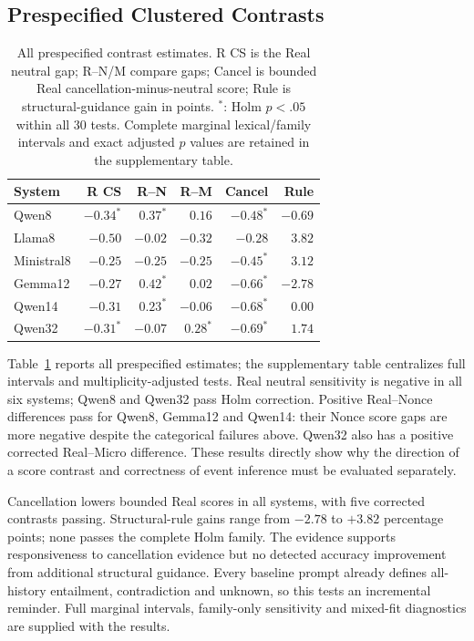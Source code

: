 \documentclass[sigconf,anonymous,review]{acmart}
\begin{document}
\subsection{Prespecified Clustered Contrasts}
\begin{table}[t]
\centering
\caption{All prespecified contrast estimates. R CS is the Real neutral gap; R--N/M compare gaps; Cancel is bounded Real cancellation-minus-neutral score; Rule is structural-guidance gain in points. $^{*}$: Holm $p<.05$ within all 30 tests. Complete marginal lexical/family intervals and exact adjusted $p$ values are retained in the supplementary table.}
\label{tab:primary_results}
\setlength{\tabcolsep}{2.3pt}
\begin{tabular}{lrrrrr}
\toprule
System & R CS & R--N & R--M & Cancel & Rule\\
\midrule
Qwen8 & $-0.34^{*}$ & $0.37^{*}$ & $0.16$ & $-0.48^{*}$ & $-0.69$ \\
Llama8 & $-0.50$ & $-0.02$ & $-0.32$ & $-0.28$ & $3.82$ \\
Ministral8 & $-0.25$ & $-0.25$ & $-0.25$ & $-0.45^{*}$ & $3.12$ \\
Gemma12 & $-0.27$ & $0.42^{*}$ & $0.02$ & $-0.66^{*}$ & $-2.78$ \\
Qwen14 & $-0.31$ & $0.23^{*}$ & $-0.06$ & $-0.68^{*}$ & $0.00$ \\
Qwen32 & $-0.31^{*}$ & $-0.07$ & $0.28^{*}$ & $-0.69^{*}$ & $1.74$ \\
\bottomrule
\end{tabular}
\end{table}

Table~\ref{tab:primary_results} reports all prespecified estimates; the supplementary table centralizes full intervals and multiplicity-adjusted tests. Real neutral sensitivity is negative in all six systems; Qwen8 and Qwen32 pass Holm correction. Positive Real--Nonce differences pass for Qwen8, Gemma12 and Qwen14: their Nonce score gaps are more negative despite the categorical failures above. Qwen32 also has a positive corrected Real--Micro difference. These results directly show why the direction of a score contrast and correctness of event inference must be evaluated separately.

Cancellation lowers bounded Real scores in all systems, with five corrected contrasts passing. Structural-rule gains range from $-2.78$ to $+3.82$ percentage points; none passes the complete Holm family. The evidence supports responsiveness to cancellation evidence but no detected accuracy improvement from additional structural guidance. Every baseline prompt already defines all-history entailment, contradiction and unknown, so this tests an incremental reminder. Full marginal intervals, family-only sensitivity and mixed-fit diagnostics are supplied with the results.
\end{document}
